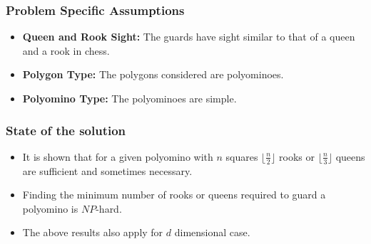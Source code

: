 \documentclass{Assignment}
\begin{document}
\subsubsection*{Problem Specific Assumptions}
\vspace{-0.3cm}
\begin{itemize}
    \itemsep-0.3em
    \item \textbf{Queen and Rook Sight:} The guards have sight similar to that of a queen and a rook in chess.
    \item \textbf{Polygon Type:} The polygons considered are polyominoes. 
    \item \textbf{Polyomino Type:} The polyominoes are simple.
\end{itemize}
\vspace{-0.8cm}
\subsubsection*{State of the solution}
\vspace{-0.3cm}
\begin{itemize}
    \itemsep-0.3em
    \item It is shown that for a given polyomino with $n$ squares $\lfloor \frac n2 \rfloor$ rooks or $\lfloor \frac n3 \rfloor$ queens are sufficient and sometimes necessary.
    \item Finding the minimum number of rooks or queens required to guard a polyomino is $NP$-hard.
    \item The above results also apply for $d$ dimensional case. 
\end{itemize}
\vspace{-0.8cm}
\end{document}
